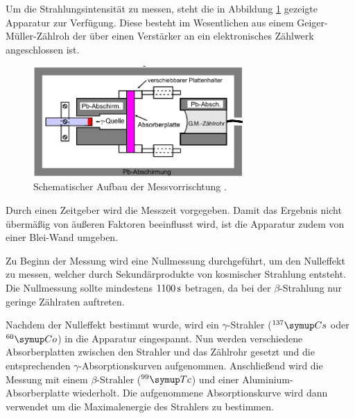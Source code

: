 Um die Strahlungsintensität zu messen, steht die in Abbildung \ref{aufbau}
gezeigte Apparatur zur Verfügung. Diese besteht im Wesentlichen aus einem
Geiger-Müller-Zählroh der über einen Verstärker an ein elektronisches
Zählwerk angeschlossen ist.
\begin{figure}[H]
  \centering
  \includegraphics[width=8cm]{bilder/app.jpg}
  \caption{Schematischer Aufbau der Messvorrischtung \cite{704}.}
  \label{aufbau}
\end{figure}
\noindent
Durch einen Zeitgeber wird die Messzeit vorgegeben. Damit das Ergebnis nicht
übermäßig von äußeren Faktoren beeinflusst wird, ist die Apparatur zudem von einer
Blei-Wand umgeben.

\noindent
Zu Beginn der Messung wird eine Nullmessung durchgeführt, um den Nulleffekt zu
messen, welcher durch Sekundärprodukte von kosmischer Strahlung entsteht. Die
Nullmessung sollte mindestens $1100\,\si{\second}$ betragen, da bei der $\beta$-Strahlung
nur geringe Zählraten auftreten.

\noindent
Nachdem der Nulleffekt bestimmt wurde, wird ein $\gamma$-Strahler ($^{137}\su{Cs}$
oder $^{60}\su{Co}$) in die Apparatur eingespannt. Nun werden verschiedene
Absorberplatten zwischen den Strahler und das Zählrohr gesetzt und die entsprechenden
$\gamma$-Absorptionskurven aufgenommen.
Anschließend wird die Messung mit einem $\beta$-Strahler ($^{99}\su{Tc}$) und einer
Aluminium-Absorberplatte wiederholt. Die aufgenommene Absorptionskurve wird dann
verwendet um die Maximalenergie des Strahlers zu bestimmen.
